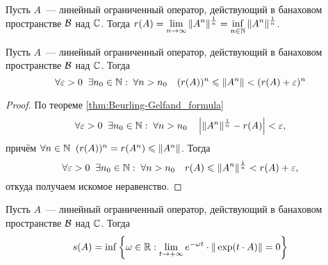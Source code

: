 \begin{theorem}
    \label{thm:Beurling-Gelfand_formula}
    Пусть $ A $~--- линейный ограниченный оператор, действующий в банаховом пространстве $ \mathcal{B} $ над $ \mathbb{C} $.
    Тогда $ \displaystyle r(A) = \lim_{n \to \infty} \| A^n \|^{\frac{1}{n}} = \inf_{n \in \mathbb{N}} \| A^n \|^{\frac{1}{n}} $.
\end{theorem}

\begin{corollary}
    \label{cor:spectral_radius_norm_bounds}
    Пусть $ A $~--- линейный ограниченный оператор, действующий в банаховом пространстве $ \mathcal{B} $ над $ \mathbb{C} $.
    Тогда
    \[
        \forall \varepsilon > 0 \;\; \exists n_0 \in \mathbb{N}: \; \forall n > n_0 \quad (r(A))^n \leqslant \| A^n \| < (r(A) + \varepsilon)^n
    \]
\end{corollary}

\begin{proof}
    По теореме \ref{thm:Beurling-Gelfand_formula}
    \[
        \forall \varepsilon > 0 \;\; \exists n_0 \in \mathbb{N}: \; \forall n > n_0 \quad \left| \| A^n \|^{\frac{1}{n}} - r(A) \right| < \varepsilon,
    \]
    причём $ \forall n \in \mathbb{N} \;\; (r(A))^n = r(A^n) \leqslant \| A^n \| $.
    Тогда
    \[
        \forall \varepsilon > 0 \;\; \exists n_0 \in \mathbb{N}: \; \forall n > n_0 \quad r(A) \leqslant \| A^n \|^{\frac{1}{n}} < r(A) + \varepsilon,
    \]
    откуда получаем искомое неравенство.
\end{proof}

\begin{lemma}
    \label{lem:operator_exponential_norm_convergence}
    Пусть $ A $~--- линейный ограниченный оператор, действующий в банаховом пространстве $ \mathcal{B} $ над $ \mathbb{C} $.
    Тогда
    \[
        s(A) = \inf \left \{ \omega \in \mathbb{R}: \lim_{t \to +\infty} e^{-\omega t} \cdot \| \exp(t \cdot A) \| = 0 \right \}
    \]
\end{lemma}

